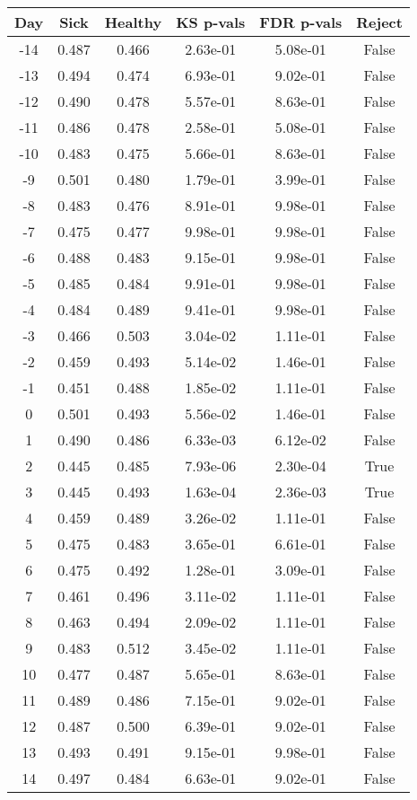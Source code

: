 \begin{tabular}{c|c|c|c|c|c}
Day &  Sick & Healthy &  KS p-vals & FDR p-vals & Reject\\
\hline
-14 & 0.487 &   0.466 &   2.63e-01 &   5.08e-01 &  False\\
-13 & 0.494 &   0.474 &   6.93e-01 &   9.02e-01 &  False\\
-12 & 0.490 &   0.478 &   5.57e-01 &   8.63e-01 &  False\\
-11 & 0.486 &   0.478 &   2.58e-01 &   5.08e-01 &  False\\
-10 & 0.483 &   0.475 &   5.66e-01 &   8.63e-01 &  False\\
 -9 & 0.501 &   0.480 &   1.79e-01 &   3.99e-01 &  False\\
 -8 & 0.483 &   0.476 &   8.91e-01 &   9.98e-01 &  False\\
 -7 & 0.475 &   0.477 &   9.98e-01 &   9.98e-01 &  False\\
 -6 & 0.488 &   0.483 &   9.15e-01 &   9.98e-01 &  False\\
 -5 & 0.485 &   0.484 &   9.91e-01 &   9.98e-01 &  False\\
 -4 & 0.484 &   0.489 &   9.41e-01 &   9.98e-01 &  False\\
 -3 & 0.466 &   0.503 &   3.04e-02 &   1.11e-01 &  False\\
 -2 & 0.459 &   0.493 &   5.14e-02 &   1.46e-01 &  False\\
 -1 & 0.451 &   0.488 &   1.85e-02 &   1.11e-01 &  False\\
  0 & 0.501 &   0.493 &   5.56e-02 &   1.46e-01 &  False\\
  1 & 0.490 &   0.486 &   6.33e-03 &   6.12e-02 &  False\\
  2 & 0.445 &   0.485 &   7.93e-06 &   2.30e-04 &   True\\
  3 & 0.445 &   0.493 &   1.63e-04 &   2.36e-03 &   True\\
  4 & 0.459 &   0.489 &   3.26e-02 &   1.11e-01 &  False\\
  5 & 0.475 &   0.483 &   3.65e-01 &   6.61e-01 &  False\\
  6 & 0.475 &   0.492 &   1.28e-01 &   3.09e-01 &  False\\
  7 & 0.461 &   0.496 &   3.11e-02 &   1.11e-01 &  False\\
  8 & 0.463 &   0.494 &   2.09e-02 &   1.11e-01 &  False\\
  9 & 0.483 &   0.512 &   3.45e-02 &   1.11e-01 &  False\\
 10 & 0.477 &   0.487 &   5.65e-01 &   8.63e-01 &  False\\
 11 & 0.489 &   0.486 &   7.15e-01 &   9.02e-01 &  False\\
 12 & 0.487 &   0.500 &   6.39e-01 &   9.02e-01 &  False\\
 13 & 0.493 &   0.491 &   9.15e-01 &   9.98e-01 &  False\\
 14 & 0.497 &   0.484 &   6.63e-01 &   9.02e-01 &  False\\
\end{tabular}